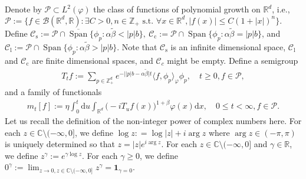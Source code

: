 \documentclass{amse-new}
\numberwithin{equation}{section}
\begin{document}
	Denote by $\mathcal P \subset L^2(\varphi)$ the class of functions of polynomial growth on $\mathbb R^d$, i.e.,
$\mathcal{P}
  	:= \{f\in \mathcal B(\mathbb R^d, \mathbb R):\exists C>0, n \in \mathbb Z_+ \text{~s.t.~} \forall x\in \mathbb R^d, |f(x)|\leq C(1+|x|)^n \}.$
	Define
	$\mathcal C_\mathrm s := \mathcal P \cap \overline{\operatorname{Span}} \{ \phi_p: \alpha \tilde \beta < |p| b \},
		~
	\mathcal C_\mathrm c   := \mathcal P \cap \operatorname{Span} \{ \phi_p : \alpha \tilde \beta = |p| b \} $, and
	$ \mathcal C_\mathrm l   := \mathcal P \cap \operatorname{Span} \{ \phi_p: \alpha \tilde \beta > |p| b \}$.
	Note that $\mathcal C_\mathrm s$ is an infinite dimensional space, $ \mathcal C_\mathrm l$ and $\mathcal C_\mathrm c$ are finite dimensional spaces, and $\mathcal C_c$ might be empty.
	Define a semigroup
\begin{align}\label{e:Tt}
	T_t f
	:= \sum_{p \in \mathbb Z_+^d} e^{-\big| |p|b - \alpha \tilde \beta \big|t} \langle f, \phi_p \rangle_{\varphi} \phi_p,
	\quad t\geq 0, f\in \mathcal P,
\end{align}
	and a family of functionals
\begin{align}\label{eq:M.13}
	m_t[f]
	:= \eta \int_0^t \mathrm du \int_{\mathbb R^d} \big(-iT_u f(x)\big)^{1+\beta} \varphi(x) \mathrm dx,
	\quad 0 \leq t< \infty, f\in \mathcal P.
\end{align}
	Let us recall the definition of the non-integer power of complex numbers here.
	For each $z\in \mathbb C\setminus (-\infty, 0]$, we define $\log z : = \log |z| + i \arg z$ where $\arg z \in (-\pi,\pi)$ is uniquely determined so that $z = |z|e^{i \arg z}$.
	For each $z\in \mathbb C\setminus (-\infty, 0]$ and $\gamma \in \mathbb R$, we define $z^\gamma := e^{\gamma \log z}$.
	For each $\gamma \geq 0$, we define $0^\gamma := \lim_{z\to 0, z\in \mathbb C\setminus (-\infty,0]} z^\gamma=\mathbf 1_{\gamma = 0}$.
\end{document}
